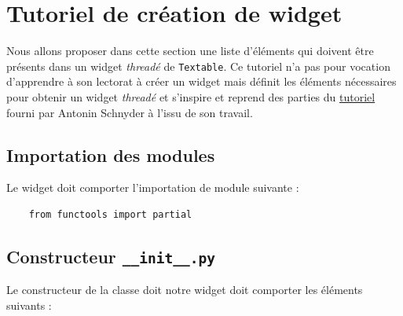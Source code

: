\documentclass{article}
\begin{document}
\section{Tutoriel de création de widget}

Nous allons proposer dans cette section une liste d'éléments qui doivent être présents dans un widget \textit{threadé} de \texttt{Textable}. Ce tutoriel n'a pas pour vocation d'apprendre à son lectorat à créer un widget mais définit les éléments nécessaires pour obtenir un widget \textit{threadé} et s'inspire et reprend des parties du \href{https://docs.google.com/document/d/1QtXm2aYMZXAyM7mfBTqxt_XrTNFqC7e3aqy7OC1A_18/edit#heading=h.xyhgv3cij1d7}{tutoriel} fourni par Antonin Schnyder à l'issu de son travail.

\subsection{Importation des modules}

Le widget doit comporter l'importation de module suivante : 

\begin{verbatim}
    from functools import partial
\end{verbatim}

\subsection{Constructeur \texttt{\_\_init\_\_.py}}

Le constructeur de la classe doit notre widget doit comporter les éléments suivants : 
\end{document}
